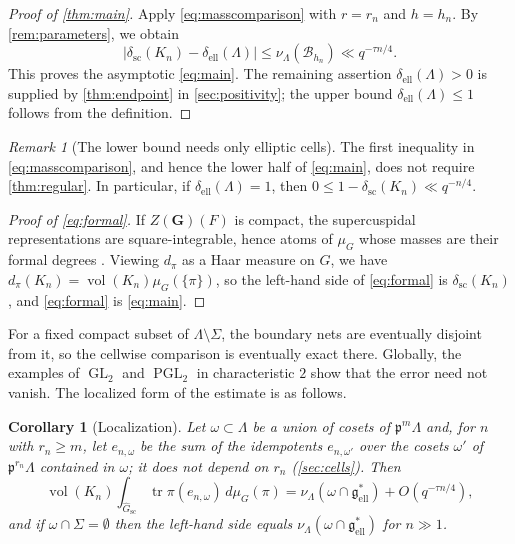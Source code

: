 \documentclass[11pt,reqno]{amsart}
\numberwithin{equation}{section}
\theoremstyle{plain}
\newtheorem{corollary}[theorem]{Corollary}
\theoremstyle{definition}
\theoremstyle{remark}
\newtheorem{remark}[theorem]{Remark}
\theoremstyle{plain}
\newcommand{\pp}{\mathfrak{p}}   %
\newcommand{\Lat}{\mathcal{L}}   %
\newcommand{\dLat}{\Lambda}      %
\newcommand{\bG}{\mathbf{G}}     %
\newcommand{\g}{\mathfrak{g}}    %
\newcommand{\gd}{\mathfrak{g}^*} %
\newcommand{\Ell}[2][]{#2_{#1\mathrm{ell}}}   %
\newcommand{\scd}[1]{\delta_{\mathrm{sc}}(#1)}
\newcommand{\fdeg}[1]{d_{#1}}  %
\newcommand{\elld}[2][]{\delta_{\mathrm{ell}}^{#1}(#2)}  %
\newcommand{\Bad}{\mathcal{B}}   %
\newcommand{\bnets}{boundary nets}
\newcommand{\Gsc}{\widehat{G}_{\mathrm{sc}}}    %
\newcommand{\abs}[1]{\lvert#1\rvert}
\DeclareMathOperator{\vol}{vol}
\DeclareMathOperator{\tr}{tr}
\DeclareMathOperator{\GL}{GL}
\DeclareMathOperator{\PGL}{PGL}
\newcommand{\eexp}{\tau}
\newcommand{\cell}{\omega}
\newcommand{\Crv}{\Sigma}
\begin{document}
\begin{proof}[Proof of \cref{thm:main}]
Apply \eqref{eq:masscomparison} with $r=r_n$ and $h=h_n$.
By \cref{rem:parameters}, we obtain
\[
\abs{\scd{K_n}-\elld{\dLat}}
\le\nu_{\dLat}(\Bad_{h_n})\ll q^{-\eexp n/4}.
\]
This proves the asymptotic \eqref{eq:main}.
The remaining assertion $\elld{\dLat}>0$ is supplied by
\cref{thm:endpoint} in \cref{sec:positivity}; the upper bound
$\elld{\dLat}\le1$ follows from the definition.
\end{proof}

\begin{remark}[The lower bound needs only elliptic cells]\label{rem:lower}
The first inequality in \eqref{eq:masscomparison}, and hence
the lower half of \eqref{eq:main}, does not require \cref{thm:regular}.
In particular, if $\elld{\dLat}=1$, then
$0\le1-\scd{K_n}\ll q^{-n/4}$.
\end{remark}

\begin{proof}[Proof of \eqref{eq:formal}]
If $Z(\bG)(F)$ is compact, the supercuspidal representations are
square-integrable, hence atoms of $\mu_G$ whose masses are their formal
degrees \cite[Theorem~VIII.1.1]{MR1989693}. Viewing $\fdeg{\pi}$ as a Haar
measure on $G$, we have $\fdeg{\pi}(K_n)=\vol(K_n)\mu_G(\{\pi\})$, so the
left-hand side of \eqref{eq:formal} is $\scd{K_n}$, and \eqref{eq:formal} is
\eqref{eq:main}.
\end{proof}


For a fixed compact subset of $\dLat\setminus\Crv$, the \bnets{} are
eventually disjoint from it, so the cellwise comparison is eventually
exact there. Globally, the examples of $\GL_2$ and $\PGL_2$ in
characteristic $2$ show that the error need not vanish. The localized
form of the estimate is as follows.

\begin{corollary}[Localization]\label{cor:localized}
Let $\cell\subset \dLat$ be a union of cosets of $\pp^m\dLat$ and, for $n$ with
$r_n\ge m$, let $e_{n,\cell}$ be the sum of the idempotents $e_{n,\cell'}$ over
the cosets $\cell'$ of $\pp^{r_n}\dLat$ contained in $\cell$; it does not depend
on $r_n$ (\cref{sec:cells}). Then
\begin{equation}\label{eq:localized}
\vol(K_n)\int_{\Gsc}\tr\pi(e_{n,\cell})\,d\mu_G(\pi)
=\nu_{\dLat}(\cell\cap\Ell{\gd})+O(q^{-\eexp n/4}),
\end{equation}
and if $\cell\cap\Crv=\emptyset$ then the left-hand side equals
$\nu_{\dLat}(\cell\cap\Ell{\gd})$ for $n\gg1$.
\end{corollary}
\end{document}
